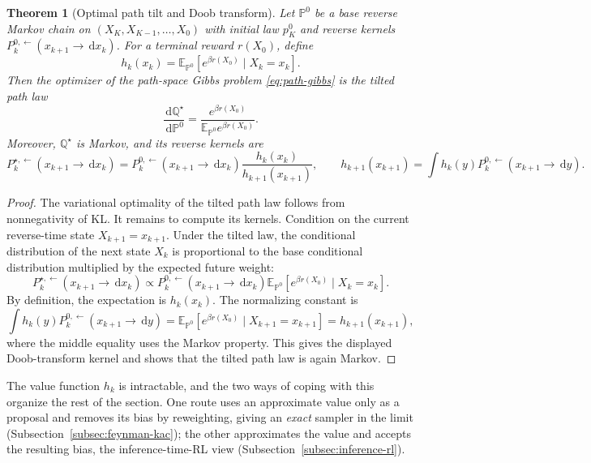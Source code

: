 \documentclass{amsart}
\numberwithin{equation}{section}
\theoremstyle{plain}
\newtheorem{theorem}{Theorem}[section]
\theoremstyle{definition}
\theoremstyle{remark}
\newcommand{\E}{\mathbb{E}}
\newcommand{\Pp}{\mathbb{P}}
\newcommand{\dd}{\,\mathrm{d}}
\begin{document}
\begin{theorem}[Optimal path tilt and Doob transform]
\label{thm:path-doob-transform}
Let $\Pp^0$ be a base reverse Markov chain on
$(X_K,X_{K-1},\ldots,X_0)$ with initial law $p_K^0$ and reverse kernels
$P_k^{0,\leftarrow}(x_{k+1}\to \dd x_k)$.  For a terminal reward
$r(X_0)$, define
\[
    h_k(x_k)
    =
    \E_{\Pp^0}\!\left[e^{\beta r(X_0)}\mid X_k=x_k\right].
\]
Then the optimizer of the path-space Gibbs problem
\eqref{eq:path-gibbs} is the tilted path law
\[
    \frac{\dd\mathbb Q^\star}{\dd\Pp^0}
    =
    \frac{e^{\beta r(X_0)}}{\E_{\Pp^0}e^{\beta r(X_0)}}.
\]
Moreover, $\mathbb Q^\star$ is Markov, and its reverse kernels are
\begin{equation}\label{eq:guided-reverse-kernel}
    P_k^{\star,\leftarrow}(x_{k+1}\to \dd x_k)
    =
    P_k^{0,\leftarrow}(x_{k+1}\to \dd x_k)
    \frac{h_k(x_k)}{h_{k+1}(x_{k+1})},
    \qquad
    h_{k+1}(x_{k+1})
    =
    \int h_k(y)P_k^{0,\leftarrow}(x_{k+1}\to \dd y).
\end{equation}
\end{theorem}

\begin{proof}
The variational optimality of the tilted path law follows from nonnegativity of
KL\@.  It remains to compute its kernels.  Condition on the current reverse-time
state $X_{k+1}=x_{k+1}$.  Under the tilted law, the
conditional distribution of the next state $X_k$ is proportional to the base
conditional distribution multiplied by the expected future weight:
\[
    P_k^{\star,\leftarrow}(x_{k+1}\to \dd x_k)
    \propto
    P_k^{0,\leftarrow}(x_{k+1}\to \dd x_k)
    \E_{\Pp^0}\!\left[e^{\beta r(X_0)}\mid X_k=x_k\right].
\]
By definition, the expectation is $h_k(x_k)$.  The normalizing constant is
\[
    \int h_k(y)P_k^{0,\leftarrow}(x_{k+1}\to \dd y)
    =
    \E_{\Pp^0}\!\left[e^{\beta r(X_0)}\mid X_{k+1}=x_{k+1}\right]
    =
    h_{k+1}(x_{k+1}),
\]
where the middle equality uses the Markov property.  This gives the displayed
Doob-transform kernel and shows that the tilted path law is again Markov.
\end{proof}

The value function $h_k$ is intractable, and the two ways of coping with this
organize the rest of the section.  One route uses an approximate value only as a
proposal and removes its bias by reweighting, giving an \emph{exact} sampler in
the limit (Subsection~\ref{subsec:feynman-kac}); the other approximates the value
and accepts the resulting bias, the inference-time-RL view
(Subsection~\ref{subsec:inference-rl}).
\end{document}

